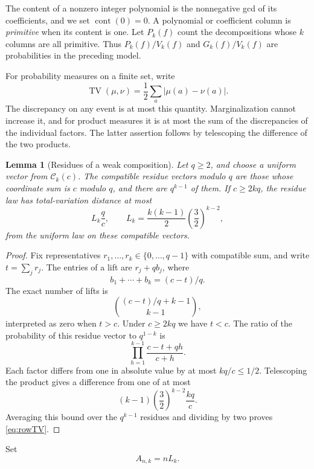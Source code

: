 \documentclass[11pt]{amsart}
\DeclareMathOperator{\cont}{cont}
\DeclareMathOperator{\TV}{TV}
\newtheorem{lemma}[theorem]{Lemma}
\theoremstyle{definition}
\theoremstyle{remark}
\begin{document}
The content of a nonzero integer polynomial is the nonnegative gcd of
its coefficients, and we set $\cont(0)=0$. A polynomial or coefficient
column is \emph{primitive} when its content is one. Let $P_k(f)$ count
the decompositions whose $k$ columns are all primitive. Thus
$P_k(f)/V_k(f)$ and $G_k(f)/V_k(f)$ are probabilities in the preceding
model.

For probability measures on a finite set, write
\[
\TV(\mu,\nu)=\frac12\sum_a|\mu(a)-\nu(a)|.
\]
The discrepancy on any event is at most this quantity. Marginalization
cannot increase it, and for product measures it is at most the sum of
the discrepancies of the individual factors. The latter assertion
follows by telescoping the difference of the two products.

\begin{lemma}[Residues of a weak composition]\label{lem:row}
Let $q\ge2$, and choose a uniform vector from $\mathcal C_k(c)$.
The compatible residue vectors modulo $q$ are those whose coordinate
sum is $c$ modulo $q$, and there are $q^{k-1}$ of them. If $c\ge2kq$,
the residue law has total-variation distance at most
\begin{equation}\label{eq:rowTV}
L_k\frac qc,\qquad
L_k=\frac{k(k-1)}2\left(\frac32\right)^{k-2},
\end{equation}
from the uniform law on these compatible vectors.
\end{lemma}

\begin{proof}
Fix representatives $r_1,\ldots,r_k\in\{0,\ldots,q-1\}$ with compatible
sum, and write $t=\sum_jr_j$. The entries of a lift are
$r_j+qb_j$, where
\[
b_1+\cdots+b_k=(c-t)/q.
\]
The exact number of lifts is
\begin{equation}\label{eq:lifts}
\binom{(c-t)/q+k-1}{k-1},
\end{equation}
interpreted as zero when $t>c$. Under $c\ge2kq$ we have $t<c$.
The ratio of the probability of this residue vector to $q^{1-k}$ is
\[
\prod_{h=1}^{k-1}\frac{c-t+qh}{c+h}.
\]
Each factor differs from one in absolute value by at most $kq/c\le1/2$.
Telescoping the product gives a difference from one of at most
\[
(k-1)\left(\frac32\right)^{k-2}\frac{kq}{c}.
\]
Averaging this bound over the $q^{k-1}$ residues and dividing by two
proves \eqref{eq:rowTV}.
\end{proof}

Set
\begin{equation}\label{eq:Ank}
A_{n,k}=nL_k.
\end{equation}
\end{document}

